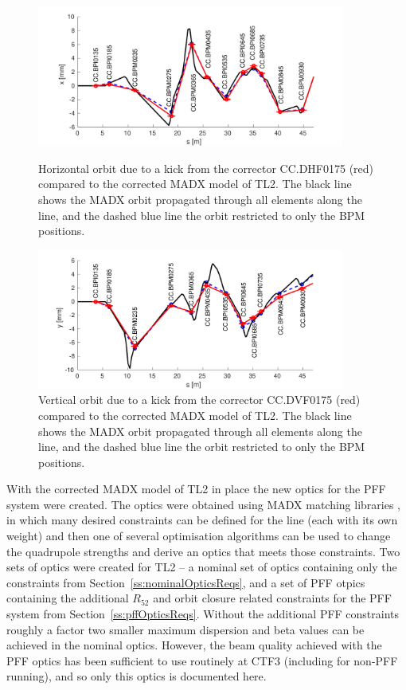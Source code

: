 \begin{figure}
  \centering
  \includegraphics[width=0.9\textwidth]{Figures/optics/modelCorrectedH}
  \caption{Horizontal orbit due to a kick from the corrector CC.DHF0175 (red) compared to the corrected MADX model of TL2. The black line shows the MADX orbit propagated through all elements along the line, and the dashed blue line the orbit restricted to only the BPM positions.}
  \label{f:modelCorrectedH}
  \includegraphics[width=0.9\textwidth]{Figures/optics/modelCorrectedV}
  \caption{Vertical orbit due to a kick from the corrector CC.DVF0175 (red) compared to the corrected MADX model of TL2. The black line shows the MADX orbit propagated through all elements along the line, and the dashed blue line the orbit restricted to only the BPM positions.}
  \label{f:modelCorrectedV}
\end{figure}


With the corrected MADX model of TL2 in place the new optics for the PFF system were created. The optics were obtained using MADX matching libraries \cite{madx}, in which many desired constraints can be defined for the line (each with its own weight) and then one of several optimisation algorithms can be used to change the quadrupole strengths and derive an optics that meets those constraints. Two sets of optics were created for TL2 -- a nominal set of optics containing only the constraints from Section~\ref{ss:nominalOpticsReqs}, and a set of PFF otpics containing the additional \(R_{52}\) and orbit closure related constraints for the PFF system from Section~\ref{ss:pffOpticsReqs}. Without the additional PFF constraints roughly a factor two smaller maximum dispersion and beta values can be achieved in the nominal optics. However, the beam quality achieved with the PFF optics has been sufficient to use routinely at CTF3 (including for non-PFF running), and so only this optics is documented here.

